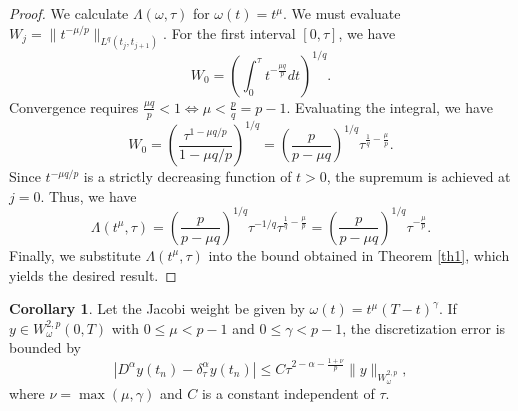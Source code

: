 \documentclass[12pt,a4paper]{article}
\theoremstyle{definition}
\newtheorem{corollary}{Corollary}
\begin{document}
\begin{proof}
    We calculate $\Lambda(\omega, \tau)$ for $\omega(t) = t^\mu$. We must evaluate $W_j = \|t^{-\mu/p}\|_{L^q(t_j, t_{j+1})}$. For the first interval $[0, \tau]$, we have
    \begin{equation}
        W_0 = \left( \int_0^\tau t^{-\frac{\mu q}{p}} dt \right)^{1/q}.
    \end{equation}
    Convergence requires $\frac{\mu q}{p} < 1 \iff \mu < \frac{p}{q} = p-1$. Evaluating the integral, we have
    \begin{equation}
        W_0 = \left( \frac{\tau^{1 - \mu q/p}}{1 - \mu q/p} \right)^{1/q} = \left(\frac{p}{p-\mu q}\right)^{1/q} \tau^{\frac{1}{q} - \frac{\mu}{p}}.
    \end{equation}
    Since $t^{-\mu q/p}$ is a strictly decreasing function of $t > 0$, the supremum is achieved at $j=0$. Thus, we have
    \begin{equation}
        \Lambda(t^\mu, \tau) = \left(\frac{p}{p-\mu q}\right)^{1/q} \tau^{-1/q} \tau^{\frac{1}{q} - \frac{\mu}{p}} = \left(\frac{p}{p-\mu q}\right)^{1/q} \tau^{-\frac{\mu}{p}}.
    \end{equation}
    Finally, we substitute $\Lambda(t^\mu, \tau)$ into the bound obtained in Theorem \ref{th1}, which yields the desired result.
\end{proof}
\begin{corollary}\label{cor2}
Let the Jacobi weight be given by $\omega(t) = t^\mu(T-t)^\gamma$. If $y \in W^{2,p}_\omega(0,T)$ with $0 \le \mu < p-1$ and $0 \le \gamma < p-1$, the discretization error is bounded by
\begin{equation}
    |D^\alpha y(t_n) - \delta_\tau^\alpha y(t_n)| \le C \tau^{2 - \alpha - \frac{1+\nu}{p}} \|y\|_{W^{2,p}_\omega},
\end{equation}
where $\nu = \max(\mu, \gamma)$ and $C$ is a constant independent of $\tau$.
\end{corollary}
\end{document}
